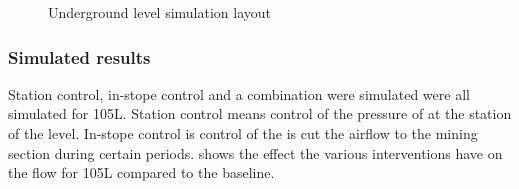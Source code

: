 	\begin{figure}[h!]
		\centering
		\caption{Underground level simulation layout}
		\label{fig: KUS Simulation level layout}
	\end{figure}	
	\clearpage
	\subsubsection{Simulated results}
	Station control, in-stope control and a combination were simulated were all simulated for 105L. Station control means control of the pressure of at the station of the level. In-stope control is control of the is cut the airflow to the mining section during certain periods.  shows the effect the various interventions have on the flow for 105L compared to the baseline.

